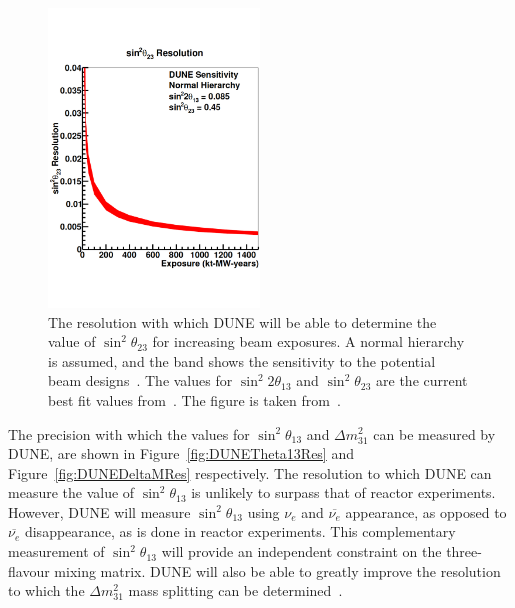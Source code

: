 \begin{figure}
  \centering
  \includegraphics[width=0.5\textwidth]{DUNETheta23Res}
  \caption[The resolution with which DUNE will be able to determine the value of $\sin^{2}\theta_{23}$ for increasing beam exposures]
          {The resolution with which DUNE will be able to determine the value of $\sin^{2}\theta_{23}$ for increasing beam exposures. A normal hierarchy is assumed, and the band shows the sensitivity to the potential beam designs~\citep{DUNECDR_V3}. The values for $\sin^{2}2\theta_{13}$ and $\sin^{2}\theta_{23}$ are the current best fit values from~\citep{NuFit2014}. The figure is taken from~\citep{DUNECDR_V2}.}
  \label{fig:DUNETheta23Res}
\end{figure}

The precision with which the values for $\sin^{2}\theta_{13}$ and $\Delta m^{2}_{31}$ can be measured by DUNE, are shown in Figure~\ref{fig:DUNETheta13Res} and Figure~\ref{fig:DUNEDeltaMRes} respectively. The resolution to which DUNE can measure the value of $\sin^{2}\theta_{13}$ is unlikely to surpass that of reactor experiments. However, DUNE will measure $\sin^{2}\theta_{13}$ using $\nu_e$ and $\overline{\nu_e}$ appearance, as opposed to $\overline{\nu_e}$ disappearance, as is done in reactor experiments. This complementary measurement of $\sin^{2}\theta_{13}$ will provide an independent constraint on the three-flavour mixing matrix. DUNE will also be able to greatly improve the resolution to which the $\Delta m^{2}_{31}$ mass splitting can be determined~\citep{DUNECDR_V2}. \\

